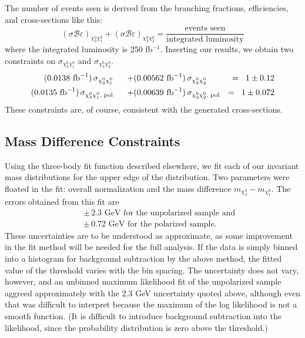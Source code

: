 \documentclass[12pt]{article}
\begin{document}
The number of events seen is derived from the branching fractions,
efficiencies, and cross-sections like this:
\begin{equation}
  (\sigma \mathcal{B}\varepsilon)_{\chi_3^0\chi_1^0} +
  (\sigma \mathcal{B}\varepsilon)_{\chi_3^0\chi_2^0} =
  \frac{\mbox{events seen}}{\mbox{integrated luminosity}}
\end{equation}
where the integrated luminosity is 250 fb$^{-1}$.  Inserting our
results, we obtain two constraints on $\sigma_{\chi_3^0\chi_1^0}$ and
$\sigma_{\chi_3^0\chi_2^0}$.
\begin{eqnarray}
  (0.0138 \mbox{ fb}^{-1}) \, \sigma_{\chi_3^0\chi_1^0} \mbox{\hspace{0.6 cm}} +
  & (0.00562 \mbox{ fb}^{-1}) \, \sigma_{\chi_3^0\chi_2^0} &= \mbox{\hspace{0.2 cm}} 1 \pm 0.12 \\
  (0.0135 \mbox{ fb}^{-1}) \, \sigma_{\chi_3^0\chi_1^0\mbox{\scriptsize, pol}} \mbox{\hspace{0.6 cm}} +
  & (0.00639 \mbox{ fb}^{-1}) \, \sigma_{\chi_3^0\chi_2^0\mbox{\scriptsize, pol}} &= \mbox{\hspace{0.2 cm}} 1 \pm 0.072
\end{eqnarray}
These constraints are, of course, consistent with the generated
cross-sections.

\subsection{Mass Difference Constraints}

Using the three-body fit function described elsewhere, we fit each of
our invariant mass distributions for the upper edge of the
distribution.  Two parameters were floated in the fit: overall
normalization and the mass difference $m_{\chi_3^0} - m_{\chi_1^0}$.
The errors obtained from this fit are
\begin{eqnarray}
  & & \pm \, 2.3 \mbox{ GeV for the unpolarized sample and} \\
  & & \pm \, 0.72 \mbox{ GeV for the polarized sample.}
\end{eqnarray}
These uncertainties are to be understood as approximate, as some
improvement in the fit method will be needed for the full analysis.
If the data is simply binned into a histogram for background
subtraction by the above method, the fitted value of the threshold
varies with the bin spacing.  The uncertainty does not vary, however,
and an unbinned maximum likelihood fit of the unpolarized sample
aggreed approximately with the 2.3 GeV uncertainty quoted above,
although even that was difficult to interpret because the maximum of
the log likelihood is not a smooth function.  (It is difficult to
introduce background subtraction into the likelihood, since the
probability distribution is zero above the threshold.)
\end{document}
